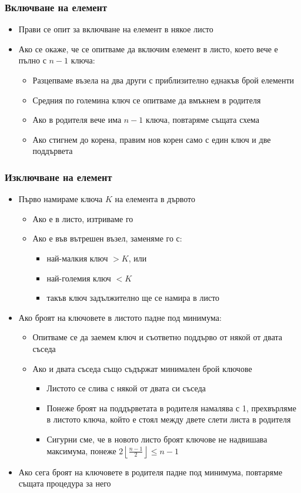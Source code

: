\documentclass{beamer}
\begin{document}
\begin{frame}
  \frametitle{Включване на елемент}
  \begin{itemize}[<+->]
  \item Прави се опит за включване на елемент в някое листо
  \item Ако се окаже, че се опитваме да включим елемент в листо, което вече е пълно с $n-1$ ключа:
    \begin{itemize}
    \item Разцепваме възела на два други с приблизително еднакъв брой елементи
    \item Средния по големина ключ се опитваме да вмъкнем в родителя
    \item Ако в родителя вече има $n-1$ ключа, повтаряме същата схема
    \item Ако стигнем до корена, правим нов корен само с един ключ и две поддървета
    \end{itemize}
  \end{itemize}
\end{frame}

\begin{frame}
  \frametitle{Изключване на елемент}
  \begin{itemize}[<+->]
  \item Първо намираме ключа $K$ на елемента в дървото
    \begin{itemize}
    \item Ако е в листо, изтриваме го
    \item Ако е във вътрешен възел, заменяме го с:
      \begin{itemize}
      \item най-малкия ключ $>K$, или
      \item най-големия ключ $<K$
      \item такъв ключ задължително ще се намира в листо
      \end{itemize}
    \end{itemize}
  \item Ако броят на ключовете в листото падне под минимума:
    \begin{itemize}
    \item Опитваме се да заемем ключ и съответно поддърво от някой от двата съседа
    \item Ако и двата съседа също съдържат минимален брой ключове
      \begin{itemize}
      \item Листото се слива с някой от двата си съседа
      \item Понеже броят на поддърветата в родителя намалява с 1, прехвърляме в листото ключа, който е стоял между двете слети листа в родителя
      \item Сигурни сме, че в новото листо броят ключове не надвишава максимума, понеже $2\left\lfloor\frac{n-1}2\right\rfloor \leq n - 1$
      \end{itemize}
    \end{itemize}
    \item Ако сега броят на ключовете в родителя падне под минимума, повтаряме същата процедура за него
  \end{itemize}
\end{frame}
\end{document}
